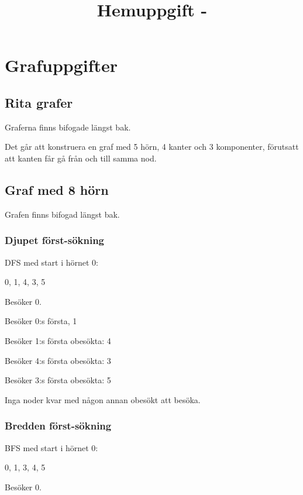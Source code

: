 \documentclass[a4paper,10pt,twoside]{article}
\title{Hemuppgift \assignmentNumber -  \courseName}
\date{\writtenDate}
\author{\myName}
\begin{document}
\maketitle %
	\thispagestyle{empty}\cfoot{}
\clearpage %
\thispagestyle{empty}\cfoot{}
\tableofcontents %
\clearpage
\setcounter{page}{1} %

\section{Grafuppgifter} %
\subsection{Rita grafer}

Graferna finns bifogade längst bak.

Det går att konstruera en graf med 5 hörn, 4 kanter och 3 komponenter, förutsatt att kanten får gå från och till samma nod.

\subsection{Graf med 8 hörn}

Grafen finns bifogad längst bak.

\subsubsection{Djupet först-sökning}

DFS med start i hörnet 0:

0, 1, 4, 3, 5

Besöker 0.

Besöker 0:s första, 1

Besöker 1:s första obesökta: 4

Besöker 4:s första obesökta: 3

Besöker 3:s första obesökta: 5

Inga noder kvar med någon annan obesökt att besöka.

\subsubsection{Bredden först-sökning}

BFS med start i hörnet 0:

0, 1, 3, 4, 5

Besöker 0.
\end{document}
